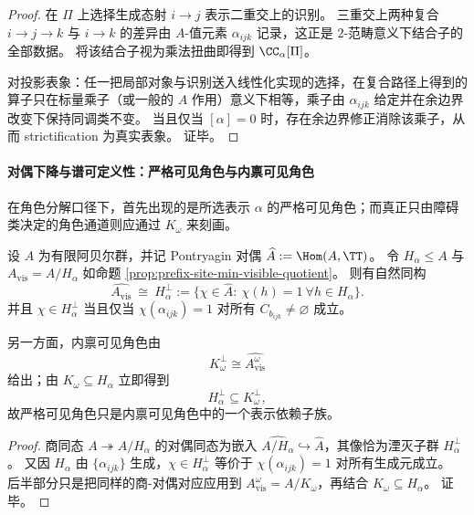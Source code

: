 \begin{proof}
在 \(\Pi\) 上选择生成态射 \(i\to j\) 表示二重交上的识别。
三重交上两种复合 \(i\to j\to k\) 与 \(i\to k\) 的差异由 \(A\)-值元素 \(\alpha_{ijk}\) 记录，这正是 \(2\)-范畴意义下结合子的全部数据。
将该结合子视为乘法扭曲即得到 \(\CC_\alpha[\Pi]\)。
\par
对投影表象：任一把局部对象与识别送入线性化实现的选择，在复合路径上得到的算子只在标量乘子（或一般的 \(A\) 作用）意义下相等，乘子由 \(\alpha_{ijk}\) 给定并在余边界改变下保持同调类不变。
当且仅当 \([\alpha]=0\) 时，存在余边界修正消除该乘子，从而 strictification 为真实表象。
证毕。
\end{proof}

\paragraph{对偶下降与谱可定义性：严格可见角色与内禀可见角色}
在角色分解口径下，首先出现的是所选表示 \(\alpha\) 的严格可见角色；而真正只由障碍类决定的角色通道则应通过 \(K_\omega\) 来刻画。

\begin{corollary}[严格可见角色与湮灭子群]\label{cor:prefix-site-visible-characters-annihilator}
设 \(A\) 为有限阿贝尔群，并记 Pontryagin 对偶 \(\widehat A:=\Hom(A,\TT)\)。
令 \(H_\alpha\le A\) 与 \(A_{\mathrm{vis}}=A/H_\alpha\) 如命题 \ref{prop:prefix-site-min-visible-quotient}。
则有自然同构
\[
\widehat{A_{\mathrm{vis}}}\ \cong\ H_\alpha^\perp
:=\{\chi\in\widehat A:\ \chi(h)=1\ \forall h\in H_\alpha\}.
\]
并且 \(\chi\in H_\alpha^\perp\) 当且仅当 \(\chi(\alpha_{ijk})=1\) 对所有 \(C_{b_{ijk}}\neq\varnothing\) 成立。
\par
另一方面，内禀可见角色由
\[
K_\omega^\perp\cong \widehat{A_{\mathrm{vis}}^\omega}
\]
给出；由 \(K_\omega\subseteq H_\alpha\) 立即得到
\[
H_\alpha^\perp\subseteq K_\omega^\perp,
\]
故严格可见角色只是内禀可见角色中的一个表示依赖子族。
\end{corollary}

\begin{proof}
商同态 \(A\twoheadrightarrow A/H_\alpha\) 的对偶同态为嵌入 \(\widehat{A/H_\alpha}\hookrightarrow \widehat A\)，其像恰为湮灭子群 \(H_\alpha^\perp\)。
又因 \(H_\alpha\) 由 \(\{\alpha_{ijk}\}\) 生成，\(\chi\in H_\alpha^\perp\) 等价于 \(\chi(\alpha_{ijk})=1\) 对所有生成元成立。
后半部分只是把同样的商-对偶对应应用到 \(A_{\mathrm{vis}}^\omega=A/K_\omega\)，再结合 \(K_\omega\subseteq H_\alpha\)。
证毕。
\end{proof}

